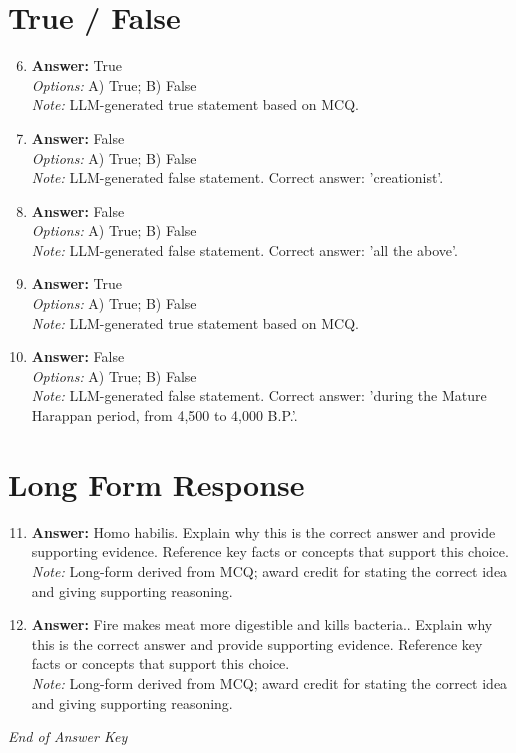 \documentclass[12pt]{article}
\begin{document}
\section*{True / False}
\begin{enumerate}[label=\arabic*.]
\setcounter{enumi}{5}
\item \textbf{Answer:} True
\\ \textit{Options:} A) True; B) False
\\ \textit{Note:} LLM-generated true statement based on MCQ.
\item \textbf{Answer:} False
\\ \textit{Options:} A) True; B) False
\\ \textit{Note:} LLM-generated false statement. Correct answer: 'creationist'.
\item \textbf{Answer:} False
\\ \textit{Options:} A) True; B) False
\\ \textit{Note:} LLM-generated false statement. Correct answer: 'all the above'.
\item \textbf{Answer:} True
\\ \textit{Options:} A) True; B) False
\\ \textit{Note:} LLM-generated true statement based on MCQ.
\item \textbf{Answer:} False
\\ \textit{Options:} A) True; B) False
\\ \textit{Note:} LLM-generated false statement. Correct answer: 'during the Mature Harappan period, from 4,500 to 4,000 B.P.'.
\end{enumerate}

\section*{Long Form Response}
\begin{enumerate}[label=\arabic*.]
\setcounter{enumi}{10}
\item \textbf{Answer:} Homo habilis. Explain why this is the correct answer and provide supporting evidence. Reference key facts or concepts that support this choice.
\\ \textit{Note:} Long-form derived from MCQ; award credit for stating the correct idea and giving supporting reasoning.
\item \textbf{Answer:} Fire makes meat more digestible and kills bacteria.. Explain why this is the correct answer and provide supporting evidence. Reference key facts or concepts that support this choice.
\\ \textit{Note:} Long-form derived from MCQ; award credit for stating the correct idea and giving supporting reasoning.
\end{enumerate}

\vfill
\noindent\textit{End of Answer Key}
\end{document}
